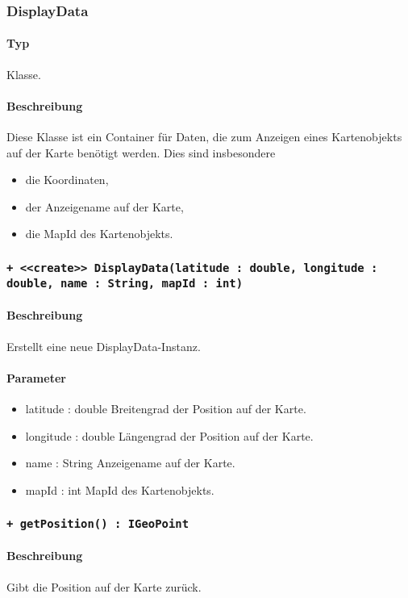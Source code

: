 \subsubsection{DisplayData}
\paragraph*{Typ}
Klasse.
\paragraph*{Beschreibung}
Diese Klasse ist ein Container für Daten, die zum Anzeigen eines Kartenobjekts auf der 
Karte benötigt werden. Dies sind insbesondere
\begin{itemize}
    \item die Koordinaten,
    \item der Anzeigename auf der Karte,
    \item die MapId des Kartenobjekts.
\end{itemize}

\subsubsection*{\texttt{+ <<create>> DisplayData(latitude : double, longitude : double, name : String, mapId : int)}}%
\paragraph*{Beschreibung}
Erstellt eine neue DisplayData-Instanz.
\paragraph*{Parameter}
\begin{itemize}
    \item latitude : double Breitengrad der Position auf der Karte.
    \item longitude : double Längengrad der Position auf der Karte.
    \item name : String Anzeigename auf der Karte.
    \item mapId : int MapId des Kartenobjekts.
\end{itemize}

\subsubsection*{\texttt{+ getPosition() : IGeoPoint}}%
\paragraph*{Beschreibung}
Gibt die Position auf der Karte zurück.
